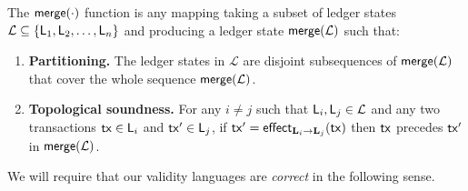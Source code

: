 \begin{definition}
  \label{def:merge}
  The $\merge(\cdot)$ function is any mapping taking a
  subset of ledger states $\mathcal{L} \subseteq
  \{\LState_1,\LState_2,\ldots,\LState_n\}$
  and producing a ledger state $\merge(\mathcal{L})$
  such that:
  \begin{enumerate}
    \item \textbf{Partitioning.}
      The ledger states in $\mathcal{L}$ are disjoint subsequences of
      $\merge(\mathcal{L})$ that cover the whole sequence $\merge(\mathcal{L})$.
    \item \textbf{Topological soundness.}
      For any $i\neq j$ such that $\LState_i,\LState_j\in\mathcal{L}$
      and any two transactions $\tx \in
      \LState_i$ and $\tx' \in \LState_j$,
      if $\tx' = \eff{\Ledger_i}{\Ledger_j}(\tx)$
      then $\tx$ precedes $\tx'$ in $\merge(\mathcal{L})$.
  \end{enumerate}
\end{definition}




We will require that our validity languages are \emph{correct} in the following
sense.

